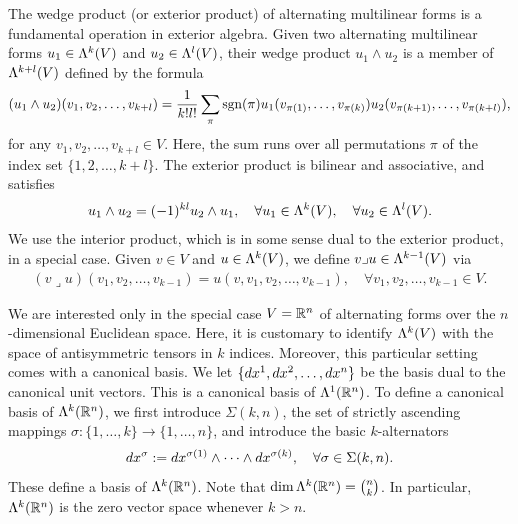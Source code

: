 \documentclass[10pt,letterpaper]{article}
\begin{document}
The wedge product (or exterior product) of alternating multilinear forms is a fundamental operation in exterior algebra. 
Given two alternating multilinear forms \( u_1 \in \Lambda^{k}(V) \) and \( u_2 \in \Lambda^{l}(V) \), 
their wedge product \( u_1 \wedge u_2 \) is a member of $\Lambda^{k+l}(V)$
defined by the formula 
\begin{gather*}
    (u_1 \wedge u_2)(v_1, v_2, \ldots, v_{k+l}) 
    = 
    \frac{1}{k! l!} 
    \sum_{ \pi } 
    \operatorname{sgn}(\pi) 
    u_1( v_{\pi(  1)}, \ldots, v_{\pi(k  )} ) 
    u_2( v_{\pi(k+1)}, \ldots, v_{\pi(k+l)} ),
\end{gather*}
for any \( v_1, v_2, \ldots, v_{k+l} \in V \).
Here, the sum runs over all permutations $\pi$ of the index set \(\{ 1, 2, \ldots, k+l \}\).
The exterior product is bilinear and associative, and satisfies 
\begin{align*}
    u_1 \wedge u_2 = (-1)^{kl} u_2 \wedge u_1,
    \quad 
    \forall u_1 \in \Lambda^{k}(V),
    \quad 
    \forall u_2 \in \Lambda^{l}(V).
\end{align*}
We use the interior product, which is in some sense dual to the exterior product, in a special case. Given $v \in V$ and $u \in \Lambda^{k}(V)$, we define $v \lrcorner u \in \Lambda^{k-1}(V)$ via 
\begin{align*}
    (v \lrcorner u)( v_1, v_2, \ldots, v_{k-1} ) = u( v, v_1, v_2, \ldots, v_{k-1} ),
    \quad 
    \forall v_1, v_2, \ldots, v_{k-1} \in V.
\end{align*}

We are interested only in the special case $V = {\mathbb R}^{n}$ of alternating forms over the $n$-dimensional Euclidean space. 
Here, it is customary to identify $\Lambda^{k}(V)$ with the space of antisymmetric tensors in $k$ indices. 
Moreover, this particular setting comes with a canonical basis. 
We let \(\{dx^1, dx^2, \ldots, dx^{n}\}\) be the basis dual to the canonical unit vectors.
This is a canonical basis of $\Lambda^{1}({\mathbb R}^{n})$. 
To define a canonical basis of $\Lambda^{k}({\mathbb R}^{n})$, 
we first introduce $\Sigma(k,n)$, the set of strictly ascending mappings $\sigma : \{1,\dots,k\} \rightarrow \{1,\dots,n\}$,
and introduce the basic $k$-alternators 
\begin{align*}
    dx^{\sigma} := dx^{\sigma(1)} \wedge \dots \wedge dx^{\sigma(k)}, 
    \quad 
    \forall \sigma \in \Sigma(k,n). 
\end{align*}
These define a basis of $\Lambda^{k}({\mathbb R}^{n})$.
Note that 
$\dim \Lambda^{k}({\mathbb R}^{n}) = \binom{n}{k}$. 
In particular, $\Lambda^{k}({\mathbb R}^{n})$ is the zero vector space whenever $k > n$.
\end{document}
